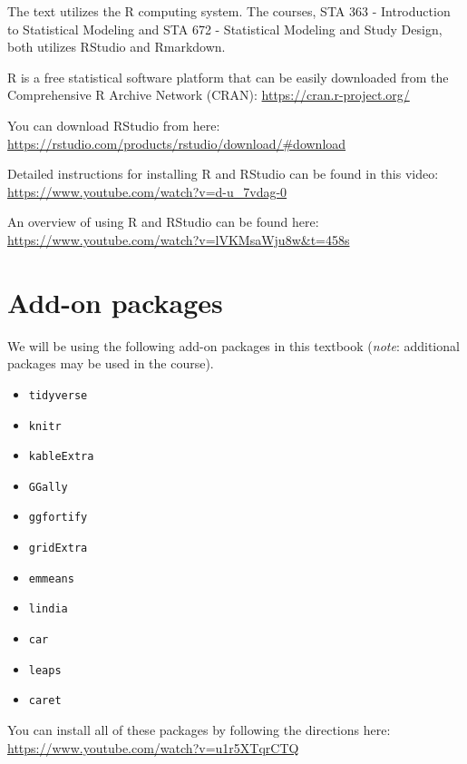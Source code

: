 \documentclass[
]{book}
\providecommand{\tightlist}{%
  \setlength{\itemsep}{0pt}\setlength{\parskip}{0pt}}
\begin{document}
The text utilizes the R computing system. The courses, STA 363 - Introduction to Statistical Modeling and STA 672 - Statistical Modeling and Study Design, both utilizes RStudio and Rmarkdown.

R is a free statistical software platform that can be easily downloaded from the Comprehensive R Archive Network (CRAN): \url{https://cran.r-project.org/}

You can download RStudio from here: \url{https://rstudio.com/products/rstudio/download/\#download}

Detailed instructions for installing R and RStudio can be found in this video: \url{https://www.youtube.com/watch?v=d-u_7vdag-0}

An overview of using R and RStudio can be found here: \url{https://www.youtube.com/watch?v=lVKMsaWju8w\&t=458s}

\hypertarget{add-on-packages}{%
\section*{Add-on packages}\label{add-on-packages}}

We will be using the following add-on packages in this textbook (\emph{note}: additional packages may be used in the course).

\begin{itemize}
\tightlist
\item
  \texttt{tidyverse} \citep{R-tidyverse}
\item
  \texttt{knitr} \citep{R-knitr}
\item
  \texttt{kableExtra} \citep{R-kableExtra}
\item
  \texttt{GGally} \citep{R-GGally}
\item
  \texttt{ggfortify} \citep{R-ggfortify}
\item
  \texttt{gridExtra} \citep{R-gridExtra}
\item
  \texttt{emmeans} \citep{R-emmeans}
\item
  \texttt{lindia} \citep{R-lindia}
\item
  \texttt{car} \citep{R-car}
\item
  \texttt{leaps} \citep{R-leaps}
\item
  \texttt{caret} \citep{R-caret}
\end{itemize}

You can install all of these packages by following the directions here: \url{https://www.youtube.com/watch?v=u1r5XTqrCTQ}
\end{document}

